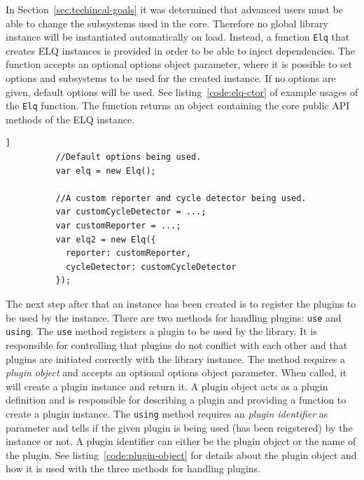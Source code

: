 \documentclass[a4paper,11pt]{kth-mag}
\newcommand{\code}[1]{\texttt{#1}}
\newcommand\abbr[2][]{\uppercase{#2}\ifthenelse{\equal{#1}{}}%
                     {}{#1}}
\begin{document}
        In Section~\ref{sec:techincal-goals} it was determined that advanced users must be able to change the subsystems used in the core.
        Therefore no global library instance will be instantiated automatically on load.
        Instead, a function \code{Elq} that creates \abbr{elq} instances is provided in order to be able to inject dependencies.
        The function accepts an optional options object parameter, where it is possible to set options and subsystems to be used for the created instance.
        If no options are given, default options will be used.
        See listing~\ref{code:elq-ctor} of example usages of the \code{Elq} function.
        The function returns an object containing the core public \gls{API} methods of the \abbr{elq} instance.
        \begin{lstlisting}[gobble=10,caption={Example usages of the \code{Elq} function that creates \abbr{elq} instances.},captionpos=b,label={code:elq-ctor}]]
          //Default options being used.
          var elq = new Elq();

          //A custom reporter and cycle detector being used.
          var customCycleDetector = ...;
          var customReporter = ...;
          var elq2 = new Elq({
            reporter: customReporter,
            cycleDetector: customCycleDetector
          });
        \end{lstlisting}

        The next step after that an instance has been created is to register the plugins to be used by the instance.
        There are two methods for handling plugins: \code{use} and \code{using}.
        The \code{use} method registers a plugin to be used by the library.
        It is responsible for controlling that plugins do not conflict with each other and that plugins are initiated correctly with the library instance.
        The method requires a \emph{plugin object} and accepts an optional options object parameter.
        When called, it will create a plugin instance and return it.
        A plugin object acts as a plugin definition and is responsible for describing a plugin and providing a function to create a plugin instance.
        The \code{using} method requires an \emph{plugin identifier} as parameter and tells if the given plugin is being used (has been reigstered) by the instance or not.
        A plugin identifier can either be the plugin object or the name of the plugin.
        See listing~\ref{code:plugin-object} for details about the plugin object and how it is used with the three methods for handling plugins.
\end{document}
